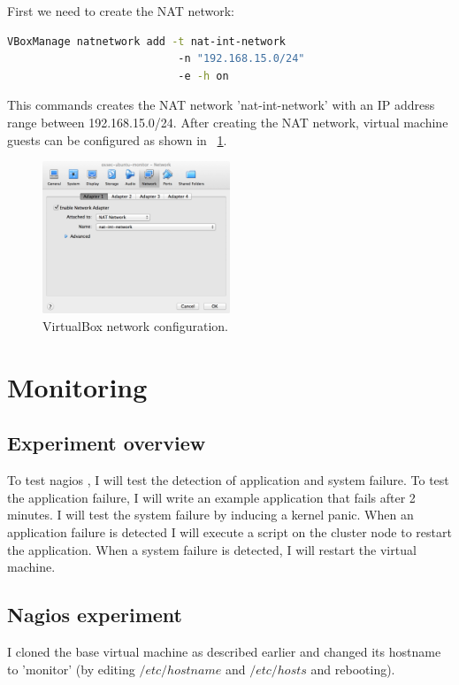 \documentclass[12pt]{report}
\begin{document}
\noindent First we need to create the NAT network:
\begin{lstlisting}[language=bash]
 VBoxManage natnetwork add -t nat-int-network 
                           -n "192.168.15.0/24"
                           -e -h on
\end{lstlisting}
This commands creates the NAT network 'nat-int-network' with an IP
address range between 192.168.15.0/24.
After creating the NAT network, virtual machine guests can be
configured as shown in ~\cref{fig:vbox_network_config}.
\begin{figure}[h!]
  \caption{VirtualBox network configuration.}
  \label{fig:vbox_network_config}
  \centering
    \includegraphics[width=0.5\textwidth]{pics/vbox_network_config.png}
\end{figure}


\section{Monitoring}
\subsection{Experiment overview}
To test nagios \cite{nagios:2013}, I will test the detection of
application and system failure. To test the application failure, I
will write an example application that fails after
2 minutes. I will test the system failure by inducing a kernel panic.
When an application failure is detected I will execute a script on the
cluster node to restart the application.
When a system failure is detected, I will restart the virtual
machine. 

\subsection{Nagios experiment}
I cloned the base virtual machine as described earlier and changed its
hostname to 'monitor' (by editing $/etc/hostname$ and $/etc/hosts$ and
rebooting).
\end{document}
